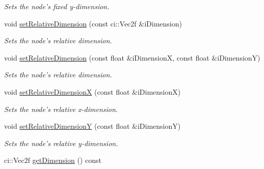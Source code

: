 \begin{DoxyCompactItemize}
\begin{DoxyCompactList}\small\item\em Sets the node's fixed y-\/dimension. \end{DoxyCompactList}\item 
\hypertarget{class_ui_base_a3e7ab055d44abda72530a6a575a226df}{void \hyperlink{class_ui_base_a3e7ab055d44abda72530a6a575a226df}{set\-Relative\-Dimension} (const ci\-::\-Vec2f \&i\-Dimension)}\label{class_ui_base_a3e7ab055d44abda72530a6a575a226df}

\begin{DoxyCompactList}\small\item\em Sets the node's relative dimension. \end{DoxyCompactList}\item 
\hypertarget{class_ui_base_adfc1187e43ffba5d98cca7110cc93336}{void \hyperlink{class_ui_base_adfc1187e43ffba5d98cca7110cc93336}{set\-Relative\-Dimension} (const float \&i\-Dimension\-X, const float \&i\-Dimension\-Y)}\label{class_ui_base_adfc1187e43ffba5d98cca7110cc93336}

\begin{DoxyCompactList}\small\item\em Sets the node's relative dimension. \end{DoxyCompactList}\item 
\hypertarget{class_ui_base_ae3e672131583aae7defb4e91f4f26e94}{void \hyperlink{class_ui_base_ae3e672131583aae7defb4e91f4f26e94}{set\-Relative\-Dimension\-X} (const float \&i\-Dimension\-X)}\label{class_ui_base_ae3e672131583aae7defb4e91f4f26e94}

\begin{DoxyCompactList}\small\item\em Sets the node's relative x-\/dimension. \end{DoxyCompactList}\item 
\hypertarget{class_ui_base_a60b0e32f60d41cc6e4f0ff62883eb8fb}{void \hyperlink{class_ui_base_a60b0e32f60d41cc6e4f0ff62883eb8fb}{set\-Relative\-Dimension\-Y} (const float \&i\-Dimension\-Y)}\label{class_ui_base_a60b0e32f60d41cc6e4f0ff62883eb8fb}

\begin{DoxyCompactList}\small\item\em Sets the node's relative y-\/dimension. \end{DoxyCompactList}\item 
\hypertarget{class_ui_base_af2bb845a631dce0526c51df99fd0f0f5}{ci\-::\-Vec2f \hyperlink{class_ui_base_af2bb845a631dce0526c51df99fd0f0f5}{get\-Dimension} () const }\label{class_ui_base_af2bb845a631dce0526c51df99fd0f0f5}


\end{DoxyCompactItemize}
